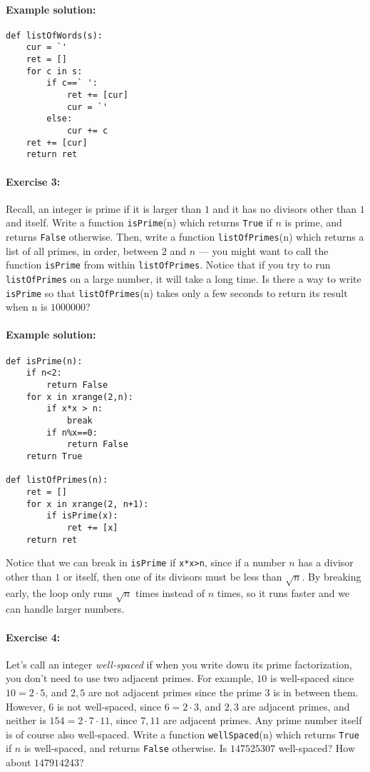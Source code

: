 \documentclass[11pt]{article}
\begin{document}
\paragraph{Example solution:}
\begin{verbatim}
def listOfWords(s):
    cur = `'
    ret = []
    for c in s:
        if c==` ':
            ret += [cur]
            cur = `'
        else:
            cur += c
    ret += [cur]
    return ret
\end{verbatim}

\paragraph{Exercise 3:}
Recall, an integer is prime if it is larger than $1$ and it has no
divisors other than $1$ and itself.  Write a function
\texttt{isPrime}(n)
which returns \texttt{True} if $n$ is prime, and returns
\texttt{False} otherwise.  Then, write a function
\texttt{listOfPrimes}(n) which returns a list of all primes, in order,
between $2$ and $n$ --- you might want to call the function
\texttt{isPrime} from within \texttt{listOfPrimes}.  Notice that if
you try to run \texttt{listOfPrimes} on a large number, it will take a
long time.  Is there a way to write \texttt{isPrime} so that
\texttt{listOfPrimes}(n) takes only a few seconds to return its result
when n is $1000000$?

\paragraph{Example solution:}
\begin{verbatim}
def isPrime(n):
    if n<2:
        return False
    for x in xrange(2,n):
        if x*x > n:
            break
        if n%x==0:
            return False
    return True

def listOfPrimes(n):
    ret = []
    for x in xrange(2, n+1):
        if isPrime(x):
            ret += [x]
    return ret
\end{verbatim}

\noindent Notice that we can break in \texttt{isPrime} if
\texttt{x*x>n}, since if a number $n$
has a divisor other than $1$ or itself, then one of its divisors must
be less than $\sqrt{n}$.  By breaking early, the loop only runs
$\sqrt{n}$ times instead of $n$ times, so it runs faster and we can
handle larger numbers.

\paragraph{Exercise 4:}
Let's call an integer {\em well-spaced} if when you write down its
prime factorization, you don't need to use two adjacent primes.  For
example, $10$ is well-spaced since $10 = 2\cdot 5$, and $2,5$ are not
adjacent primes since the prime $3$ is in between them.  However, $6$ is
not well-spaced, since $6 = 2\cdot 3$, and $2,3$ are adjacent
primes, and neither is $154 = 2\cdot 7\cdot 11$, since $7,11$ are adjacent
primes. Any prime number itself is of course also well-spaced.  Write
a function \texttt{wellSpaced}(n) which returns \texttt{True} if $n$
is well-spaced, and returns \texttt{False} otherwise.  Is $147525307$
well-spaced?  How about $147914243$?
\end{document}

